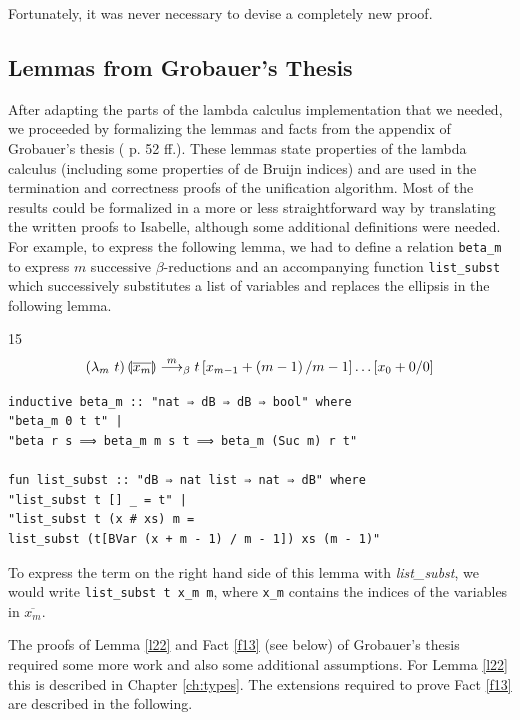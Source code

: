 Fortunately, it was never necessary to devise a completely new proof.

\subsection{Lemmas from Grobauer's Thesis}

After adapting the parts of the lambda calculus implementation that we needed, we proceeded by formalizing the lemmas and facts from the appendix of Grobauer's thesis (\cite{Grobauer} p. 52 ff.). These lemmas state properties of the lambda calculus (including some properties of de Bruijn indices) and are used in the termination and correctness proofs of the unification algorithm. Most of the results could be formalized in a more or less straightforward way by translating the written proofs to Isabelle, although some additional definitions were needed. For example, to express the following lemma, we had to define a relation \texttt{beta\_m} to express $m$ successive $\beta$-reductions and an accompanying function \texttt{list\_subst} which successively substitutes a list of variables and replaces the ellipsis in the following lemma.

\begin{lemma}{15}
	\[
	\left( \lambda_{m} \ t \right) \llparenthesis \overline{x_m} \rrparenthesis \overset{m}{\longrightarrow}_\beta t \left[x_{m - 1} + \left( m - 1 \right) / m - 1 \right] \dots \left[x_0 + 0 / 0 \right]
	\]
\end{lemma}

\begin{verbatim}
inductive beta_m :: "nat ⇒ dB ⇒ dB ⇒ bool" where
"beta_m 0 t t" |
"beta r s ⟹ beta_m m s t ⟹ beta_m (Suc m) r t"

fun list_subst :: "dB ⇒ nat list ⇒ nat ⇒ dB" where
"list_subst t [] _ = t" |
"list_subst t (x # xs) m =
list_subst (t[BVar (x + m - 1) / m - 1]) xs (m - 1)"
\end{verbatim}

To express the term on the right hand side of this lemma with \textit{list\_subst}, we would write \texttt{list\_subst t x\_m m}, where \texttt{x\_m} contains the indices of the variables in $\overline{x_m}$.

The proofs of Lemma \ref{l22} and Fact \ref{f13} (see below) of Grobauer's thesis \cite{Grobauer} required some more work and also some additional assumptions. For Lemma \ref{l22} this is described in Chapter \ref{ch:types}. The extensions required to prove Fact \ref{f13} are described in the following.

